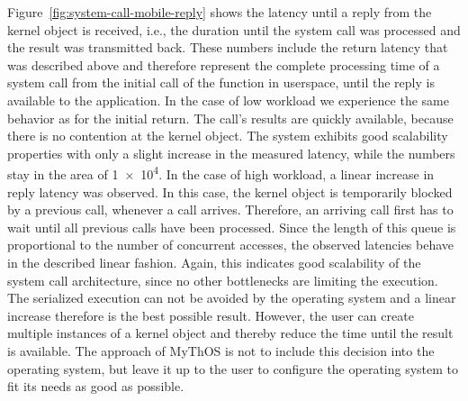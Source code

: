 Figure~\ref{fig:system-call-mobile-reply} shows the latency until a reply from the kernel object is received, i.e., the duration until the system call was processed and the result was transmitted back. These numbers include the return latency that was described above and therefore represent the complete processing time of a system call from the initial call of the function in userspace, until the reply is available to the application.
In the case of low workload we experience the same behavior as for the initial return. The call's results are quickly available, because there is no contention at the kernel object. The system exhibits good scalability properties with only a slight increase in the measured latency, while the numbers stay in the area of \num{1e4}.
In the case of high workload, a linear increase in reply latency was observed. In this case, the kernel object is temporarily blocked by a previous call, whenever a call arrives. Therefore, an arriving call first has to wait until all previous calls have been processed. Since the length of this queue is proportional to the number of concurrent accesses, the observed latencies behave in the described linear fashion. Again, this indicates good scalability of the system call architecture, since no other bottlenecks are limiting the execution. The serialized execution can not be avoided by the operating system and a linear increase therefore is the best possible result.
However, the user can create multiple instances of a kernel object and thereby reduce the time until the result is available. The approach of MyThOS is not to include this decision into the operating system, but leave it up to the user to configure the operating system to fit its needs as good as possible.


% 
% 


